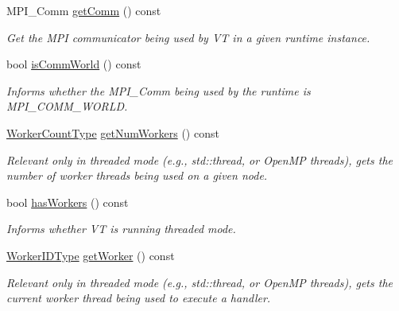\begin{DoxyCompactItemize}
$$M\+P\+I\+\_\+\+Comm \hyperlink{structvt_1_1ctx_1_1_context_a2d4378c97824792991a3410449cf19db}{get\+Comm} () const
\begin{DoxyCompactList}\small\item\em Get the M\+PI communicator being used by VT in a given runtime instance. \end{DoxyCompactList}\item 
bool \hyperlink{structvt_1_1ctx_1_1_context_a78d9926c3f75b1296e81607fd303f8f1}{is\+Comm\+World} () const
\begin{DoxyCompactList}\small\item\em Informs whether the M\+P\+I\+\_\+\+Comm being used by the runtime is {\ttfamily M\+P\+I\+\_\+\+C\+O\+M\+M\+\_\+\+W\+O\+R\+LD}. \end{DoxyCompactList}\item 
\hyperlink{namespacevt_aa93398ea48f2cb6c188512250f7cc248}{Worker\+Count\+Type} \hyperlink{structvt_1_1ctx_1_1_context_a0ea881fa8c4d8fee74e85d8a6c52a6f0}{get\+Num\+Workers} () const
\begin{DoxyCompactList}\small\item\em Relevant only in threaded mode (e.\+g., {\ttfamily std\+::thread}, or Open\+MP threads), gets the number of worker threads being used on a given node. \end{DoxyCompactList}\item 
bool \hyperlink{structvt_1_1ctx_1_1_context_a17b1fd9fd7bfc2afdd55707d1f321f76}{has\+Workers} () const
\begin{DoxyCompactList}\small\item\em Informs whether VT is running threaded mode. \end{DoxyCompactList}\item 
\hyperlink{namespacevt_a656e362091da17b9b93d0655b36e3392}{Worker\+I\+D\+Type} \hyperlink{structvt_1_1ctx_1_1_context_a1e39e0561109fd30b45a427ddb055cd2}{get\+Worker} () const
\begin{DoxyCompactList}\small\item\em Relevant only in threaded mode (e.\+g., {\ttfamily std\+::thread}, or Open\+MP threads), gets the current worker thread being used to execute a handler. \end{DoxyCompactList}\end{DoxyCompactItemize}

